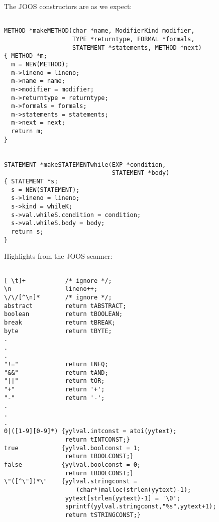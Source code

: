 \begin{slide*}
The JOOS constructors are as we expect:

\begin{scriptsize}
\begin{verbatim}

METHOD *makeMETHOD(char *name, ModifierKind modifier, 
                   TYPE *returntype, FORMAL *formals, 
                   STATEMENT *statements, METHOD *next)
{ METHOD *m;
  m = NEW(METHOD);
  m->lineno = lineno;
  m->name = name;
  m->modifier = modifier;
  m->returntype = returntype;
  m->formals = formals;
  m->statements = statements;
  m->next = next;
  return m;
}


STATEMENT *makeSTATEMENTwhile(EXP *condition, 
                              STATEMENT *body)
{ STATEMENT *s;
  s = NEW(STATEMENT);
  s->lineno = lineno;
  s->kind = whileK;
  s->val.whileS.condition = condition;
  s->val.whileS.body = body;
  return s;
}
\end{verbatim}
\end{scriptsize}
\vfil
\end{slide*}
 
\begin{slide*}
Highlights from the JOOS scanner:

\begin{scriptsize}
\begin{verbatim}

[ \t]+           /* ignore */;
\n               lineno++;
\/\/[^\n]*       /* ignore */;
abstract         return tABSTRACT;
boolean          return tBOOLEAN;
break            return tBREAK;
byte             return tBYTE;
.
.
.
"!="             return tNEQ;
"&&"             return tAND;
"||"             return tOR;
"+"              return '+';
"-"              return '-';
.
.
.
0|([1-9][0-9]*) {yylval.intconst = atoi(yytext);
                 return tINTCONST;}
true            {yylval.boolconst = 1;
                 return tBOOLCONST;}
false           {yylval.boolconst = 0;
                 return tBOOLCONST;}
\"([^\"])*\"    {yylval.stringconst = 
                    (char*)malloc(strlen(yytext)-1);
                 yytext[strlen(yytext)-1] = '\0';
                 sprintf(yylval.stringconst,"%s",yytext+1);
                 return tSTRINGCONST;}
\end{verbatim}
\end{scriptsize}
\vfil
\end{slide*}
 
